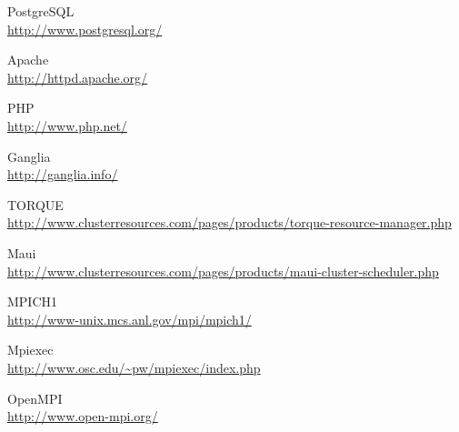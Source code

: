 \documentclass[a4paper,10pt,spanish]{article}
\begin{document}
\begin{thebibliography}{99}
PostgreSQL\\\url{http://www.postgresql.org/}

Apache\\\url{http://httpd.apache.org/}

PHP\\\url{http://www.php.net/}

Ganglia\\\url{http://ganglia.info/}

TORQUE\\\url{http://www.clusterresources.com/pages/products/torque-resource-manager.php}

Maui\\\url{http://www.clusterresources.com/pages/products/maui-cluster-scheduler.php}

MPICH1\\\url{http://www-unix.mcs.anl.gov/mpi/mpich1/}

Mpiexec\\\url{http://www.osc.edu/~pw/mpiexec/index.php}

OpenMPI\\\url{http://www.open-mpi.org/}

\end{thebibliography}
\end{document}
